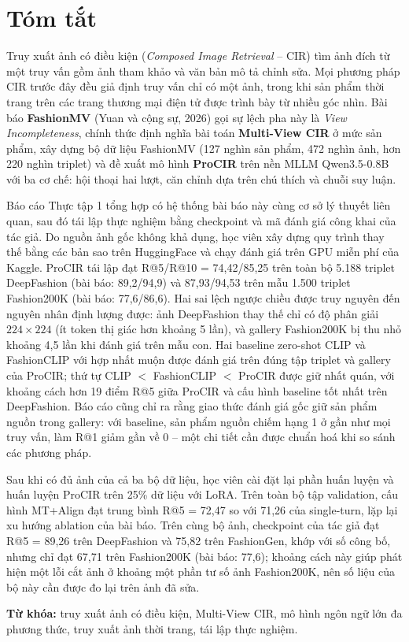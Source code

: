 \chapter*{Tóm tắt}
\onehalfspacing
\vspace{1.0cm}

Truy xuất ảnh có điều kiện (\emph{Composed Image Retrieval} -- CIR) tìm ảnh đích từ một truy vấn gồm ảnh tham khảo và văn bản mô tả chỉnh sửa. Mọi phương pháp CIR trước đây đều giả định truy vấn chỉ có một ảnh, trong khi sản phẩm thời trang trên các trang thương mại điện tử được trình bày từ nhiều góc nhìn. Bài báo \textbf{FashionMV} (Yuan và cộng sự, 2026) gọi sự lệch pha này là \emph{View Incompleteness}, chính thức định nghĩa bài toán \textbf{Multi-View CIR} ở mức sản phẩm, xây dựng bộ dữ liệu FashionMV (127 nghìn sản phẩm, 472 nghìn ảnh, hơn 220 nghìn triplet) và đề xuất mô hình \textbf{ProCIR} trên nền MLLM Qwen3.5-0.8B với ba cơ chế: hội thoại hai lượt, căn chỉnh dựa trên chú thích và chuỗi suy luận.

Báo cáo Thực tập 1 tổng hợp có hệ thống bài báo này cùng cơ sở lý thuyết liên quan, sau đó tái lập thực nghiệm bằng checkpoint và mã đánh giá công khai của tác giả. Do nguồn ảnh gốc không khả dụng, học viên xây dựng quy trình thay thế bằng các bản sao trên HuggingFace và chạy đánh giá trên GPU miễn phí của Kaggle. ProCIR tái lập đạt R@5/R@10 = 74,42/85,25 trên toàn bộ 5.188 triplet DeepFashion (bài báo: 89,2/94,9) và 87,93/94,53 trên mẫu 1.500 triplet Fashion200K (bài báo: 77,6/86,6). Hai sai lệch ngược chiều được truy nguyên đến nguyên nhân định lượng được: ảnh DeepFashion thay thế chỉ có độ phân giải $224 \times 224$ (ít token thị giác hơn khoảng 5 lần), và gallery Fashion200K bị thu nhỏ khoảng 4,5 lần khi đánh giá trên mẫu con. Hai baseline zero-shot CLIP và FashionCLIP với hợp nhất muộn được đánh giá trên đúng tập triplet và gallery của ProCIR; thứ tự CLIP $<$ FashionCLIP $<$ ProCIR được giữ nhất quán, với khoảng cách hơn 19 điểm R@5 giữa ProCIR và cấu hình baseline tốt nhất trên DeepFashion. Báo cáo cũng chỉ ra rằng giao thức đánh giá gốc giữ sản phẩm nguồn trong gallery: với baseline, sản phẩm nguồn chiếm hạng 1 ở gần như mọi truy vấn, làm R@1 giảm gần về 0 -- một chi tiết cần được chuẩn hoá khi so sánh các phương pháp.

Sau khi có đủ ảnh của cả ba bộ dữ liệu, học viên cài đặt lại phần huấn luyện và huấn luyện ProCIR trên 25\% dữ liệu với LoRA. Trên toàn bộ tập validation, cấu hình MT+Align đạt trung bình R@5 = 72,47 so với 71,26 của single-turn, lặp lại xu hướng ablation của bài báo. Trên cùng bộ ảnh, checkpoint của tác giả đạt R@5 = 89,26 trên DeepFashion và 75,82 trên FashionGen, khớp với số công bố, nhưng chỉ đạt 67,71 trên Fashion200K (bài báo: 77,6); khoảng cách này giúp phát hiện một lỗi cắt ảnh ở khoảng một phần tư số ảnh Fashion200K, nên số liệu của bộ này cần được đo lại trên ảnh đã sửa.

\bigskip
\noindent\textbf{Từ khóa:} truy xuất ảnh có điều kiện, Multi-View CIR, mô hình ngôn ngữ lớn đa phương thức, truy xuất ảnh thời trang, tái lập thực nghiệm.

